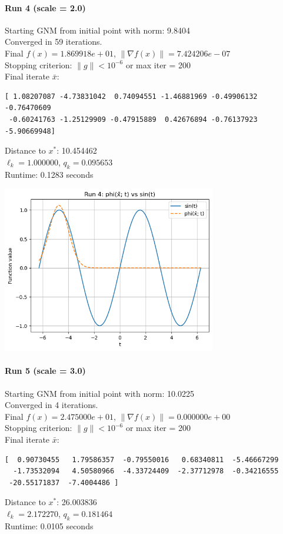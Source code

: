 \documentclass[12pt]{article}
\begin{document}
\paragraph{Run 4 (scale = 2.0)}
Starting GNM from initial point with norm: 9.8404\\
Converged in 59 iterations.\\
Final $f(x) = 1.869918e+01$, $\|\nabla f(x)\| = 7.424206e-07$\\
Stopping criterion: $\|g\| < 10^{-6}$ or max iter = 200\\
Final iterate $\bar{x}$:
\begin{verbatim}
[ 1.08207087 -4.73831042  0.74094551 -1.46881969 -0.49906132 -0.76470609
 -0.60241763 -1.25129909 -0.47915889  0.42676894 -0.76137923 -5.90669948]
\end{verbatim}
Distance to $x^*$: 10.454462\\
$\ell_k = 1.000000$, $q_k = 0.095653$\\
Runtime: 0.1283 seconds

\includegraphics[width=0.7\textwidth]{figures/plot_9.png}

\paragraph{Run 5 (scale = 3.0)}
Starting GNM from initial point with norm: 10.0225\\
Converged in 4 iterations.\\
Final $f(x) = 2.475000e+01$, $\|\nabla f(x)\| = 0.000000e+00$\\
Stopping criterion: $\|g\| < 10^{-6}$ or max iter = 200\\
Final iterate $\bar{x}$:
\begin{verbatim}
[  0.90730455   1.79586357  -0.79550016   0.68340811  -5.46667299
  -1.73532094   4.50580966  -4.33724409  -2.37712978  -0.34216555
 -20.55171837  -7.4004486 ]
\end{verbatim}
Distance to $x^*$: 26.003836\\
$\ell_k = 2.172270$, $q_k = 0.181464$\\
Runtime: 0.0105 seconds
\end{document}
